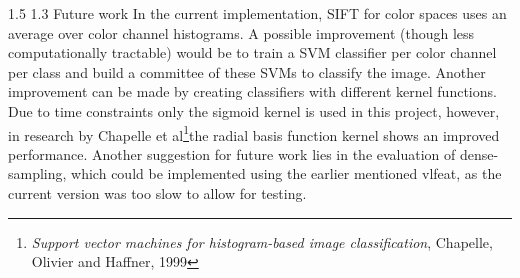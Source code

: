 \documentclass[12pt,a4paper]{amsart}
\makeatletter
\def\section{%
  \@startsection{section}{1}{\z@}%
  {1.5\linespacing\@plus\linespacing}%
  {1.3\linespacing}%
  {\bfseries\normalfont\scshape}
}
\makeatother
\begin{document}
\section{Future work}
In the current implementation, SIFT for color spaces uses an average over color channel histograms. A possible improvement (though less computationally tractable) would be to train a SVM classifier per color channel per class and build a committee of these SVMs to classify the image. Another improvement can be made by creating classifiers with different kernel functions. Due to time constraints only the sigmoid kernel is used in this project, however, in research by Chapelle et al\footnote{\textit{Support vector machines for histogram-based image classification}, Chapelle, Olivier and Haffner, 1999}the radial basis function kernel shows an improved performance. Another suggestion for future work lies in the evaluation of dense-sampling, which could be implemented using the earlier mentioned vlfeat, as the current version was too slow to allow for testing.



\end{document}
